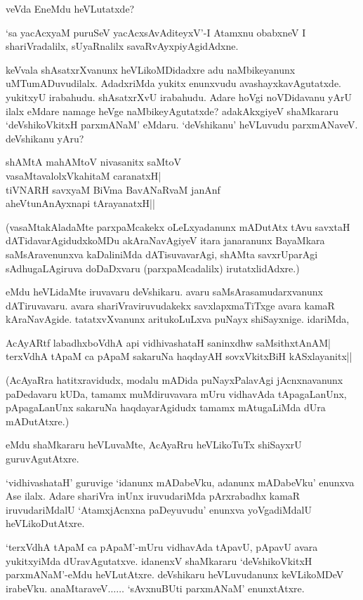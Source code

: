 veVda EneMdu heVLutatxde?

`sa yacAcxyaM puruSeV yacAcxsAvAditeyxV'-I Atamxnu obabxneV I shariVradalilx, sUyaRnalilx savaRvAyxpiyAgidAdxne.

keVvala shAsatxrXvanunx heVLikoMDidadxre adu naMbikeyanunx uMTumADuvudilalx. AdadxriMda yukitx enunxvudu avashayxkavAgutatxde. yukitxyU irabahudu. shAsatxrXvU irabahudu. Adare hoVgi noVDidavanu yArU ilalx eMdare namage heVge naMbikeyAgutatxde? adakAkxgiyeV shaMkararu `deVshikoVkitxH parxmANaM' eMdaru. `deVshikanu' heVLuvudu parxmANaveV. deVshikanu yAru?

\begin{shloka}
shAMtA mahAMtoV nivasanitx saMtoV\\
vasaMtavalolxVkahitaM caranatxH|\\
tiVNARH savxyaM BiVma BavANaRvaM janAnf\\
aheVtunA\s nAyxnapi tArayanatxH||
\end{shloka}

(vasaMtakAladaMte parxpaMcakekx oLeLxyadanunx mADutAtx tAvu savxtaH dATidavarAgidudxkoMDu akAraNavAgiyeV itara janaranunx BayaMkara saMsAravenunxva kaDaliniMda dATisuvavarAgi, shAMta savxrUparAgi sAdhugaLAgiruva doDaDxvaru (parxpaMcadalilx) irutatxlidAdxre.)

eMdu heVLidaMte iruvavaru deVshikaru. avaru saMsArasamudarxvanunx dATiruvavaru. avara shariVraviruvudakekx savxlapxmaTiTxge avara kamaR kAraNavAgide. tatatxvXvanunx aritukoLuLxva puNayx shiSayxnige. idariMda,

\begin{shloka}
AcAyARtf labadhxboVdhA api vidhivashataH saninxdhw saMsithxtAnAM|\\
terxVdhA tApaM ca pApaM sakaruNa haqdayAH sovxVkitxBiH kASxlayanitx||
\end{shloka}

(AcAyaRra hatitxravidudx, modalu mADida puNayxPalavAgi jAcnxnavanunx paDedavaru kUDa, tamamx muMdiruvavara mUru vidhavAda tApagaLanUnx, pApagaLanUnx sakaruNa haqdayarAgidudx tamamx mAtugaLiMda dUra mADutAtxre.)

eMdu shaMkararu heVLuvaMte, AcAyaRru heVLikoTuTx shiSayxrU guruvAgutAtxre.

`vidhivashataH' guruvige `idanunx mADabeVku, adanunx mADabeVku' enunxva Ase ilalx. Adare shariVra inUnx iruvudariMda pArxrabadhx kamaR iruvudariMdalU `AtamxjAcnxna paDeyuvudu' enunxva yoVgadiMdalU heVLikoDutAtxre.

`terxVdhA tApaM ca pApaM'-mUru vidhavAda tApavU, pApavU avara yukitxyiMda dUravAgutatxve. idanenxV shaMkararu `deVshikoVkitxH parxmANaM'-eMdu heVLutAtxre. deVshikaru heVLuvudanunx keVLikoMDeV irabeVku. anaMtaraveV$\ldots\ldots$ `sAvxnuBUti parxmANaM' enunxtAtxre.

